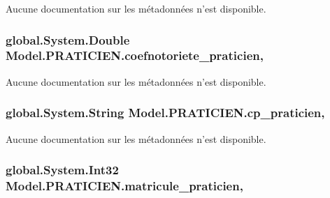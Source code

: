 Aucune documentation sur les métadonnées n'est disponible. 

\hypertarget{class_model_1_1_p_r_a_t_i_c_i_e_n_af7a6f895c280db516f12fdf90e207bae}{
\subsubsection[{coefnotoriete\-\_\-praticien}]{\setlength{\rightskip}{0pt plus 5cm}global.\-System.\-Double Model.\-P\-R\-A\-T\-I\-C\-I\-E\-N.\-coefnotoriete\-\_\-praticien\hspace{0.3cm}{\ttfamily [get]}, {\ttfamily [set]}}}\label{class_model_1_1_p_r_a_t_i_c_i_e_n_af7a6f895c280db516f12fdf90e207bae}


Aucune documentation sur les métadonnées n'est disponible. 

\hypertarget{class_model_1_1_p_r_a_t_i_c_i_e_n_a2a75459147811d5a57c500054d647925}{
\subsubsection[{cp\-\_\-praticien}]{\setlength{\rightskip}{0pt plus 5cm}global.\-System.\-String Model.\-P\-R\-A\-T\-I\-C\-I\-E\-N.\-cp\-\_\-praticien\hspace{0.3cm}{\ttfamily [get]}, {\ttfamily [set]}}}\label{class_model_1_1_p_r_a_t_i_c_i_e_n_a2a75459147811d5a57c500054d647925}


Aucune documentation sur les métadonnées n'est disponible. 

\hypertarget{class_model_1_1_p_r_a_t_i_c_i_e_n_abe4fab1270371ef15fc1342a8d048d26}{
\subsubsection[{matricule\-\_\-praticien}]{\setlength{\rightskip}{0pt plus 5cm}global.\-System.\-Int32 Model.\-P\-R\-A\-T\-I\-C\-I\-E\-N.\-matricule\-\_\-praticien\hspace{0.3cm}{\ttfamily [get]}, {\ttfamily [set]}}}\label{class_model_1_1_p_r_a_t_i_c_i_e_n_abe4fab1270371ef15fc1342a8d048d26}


